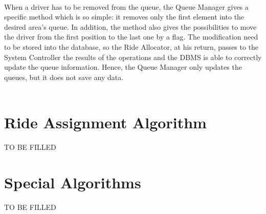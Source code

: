 \documentclass[\mainpath/main]{subfiles}
\begin{document}
\\[0.5cm]
	
When a driver has to be removed from the queue, the Queue Manager gives a specific method which is so simple: it removes only the first element into the desired area's queue. In addition, the method also gives the possibilities to move the driver from the first position to the last one by a flag. The modification need to be stored into the database, so the Ride Allocator, at his return, passes to the System Controller the results of the operations and the DBMS is able to correctly update the queue information. Hence, the Queue Manager only updates the queues, but it does not save any data.\\

\\[0.5cm]

\section{Ride Assignment Algorithm}
\label{AlgorithmDesign:RideAssignmentAlgorithm}

TO BE FILLED

\section{Special Algorithms}
\label{AlgorithmDesign:special}

TO BE FILLED
\end{document}
